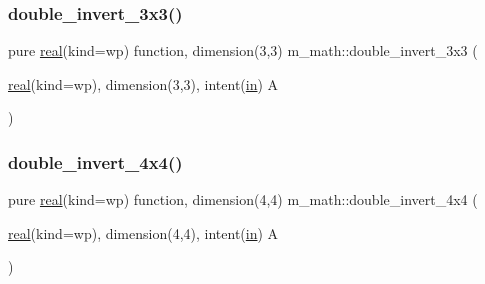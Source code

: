 \mbox{\label{namespacem__math_a7ff8d2485bffbbe9fce3e13d62a19677}} 
\subsubsection{\texorpdfstring{double\+\_\+invert\+\_\+3x3()}{double\_invert\_3x3()}}
{\footnotesize\ttfamily pure \hyperlink{read__watch_83_8txt_abdb62bde002f38ef75f810d3a905a823}{real}(kind=wp) function, dimension(3,3) m\+\_\+math\+::double\+\_\+invert\+\_\+3x3 (\begin{DoxyParamCaption}\item[{\hyperlink{read__watch_83_8txt_abdb62bde002f38ef75f810d3a905a823}{real}(kind=wp), dimension(3,3), intent(\hyperlink{M__journal_83_8txt_afce72651d1eed785a2132bee863b2f38}{in})}]{A }\end{DoxyParamCaption})\hspace{0.3cm}{\ttfamily [private]}}

\mbox{\label{namespacem__math_a258a8a014e105b40c2653d3036e7ddb6}} 
\subsubsection{\texorpdfstring{double\+\_\+invert\+\_\+4x4()}{double\_invert\_4x4()}}
{\footnotesize\ttfamily pure \hyperlink{read__watch_83_8txt_abdb62bde002f38ef75f810d3a905a823}{real}(kind=wp) function, dimension(4,4) m\+\_\+math\+::double\+\_\+invert\+\_\+4x4 (\begin{DoxyParamCaption}\item[{\hyperlink{read__watch_83_8txt_abdb62bde002f38ef75f810d3a905a823}{real}(kind=wp), dimension(4,4), intent(\hyperlink{M__journal_83_8txt_afce72651d1eed785a2132bee863b2f38}{in})}]{A }\end{DoxyParamCaption})\hspace{0.3cm}{\ttfamily [private]}}

\mbox{\label{namespacem__math_a08a8a6121a85932548baee1a0e3af4d9}} 
